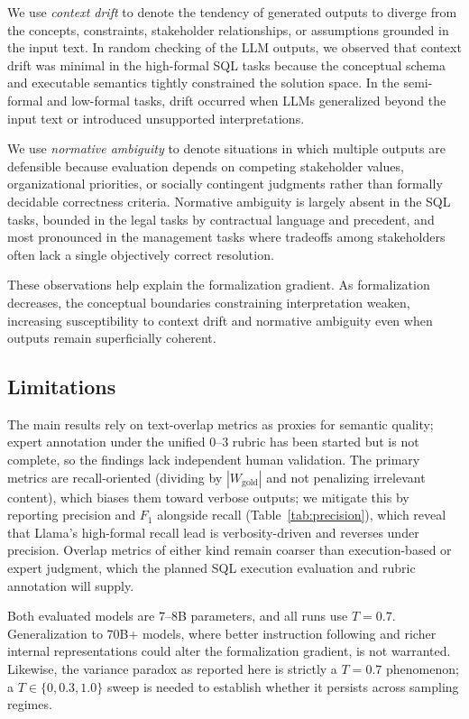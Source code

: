 \documentclass[runningheads]{llncs}
\begin{document}
We use \textit{context drift} to denote the tendency of generated outputs to diverge from the concepts, constraints, stakeholder relationships, or assumptions grounded in the input text. In random checking of the LLM outputs, we observed that context drift was minimal in the high-formal SQL tasks because the conceptual schema and executable semantics tightly constrained the solution space. In the semi-formal and low-formal tasks, drift occurred when LLMs generalized beyond the input text or introduced unsupported interpretations.

We use \textit{normative ambiguity} to denote situations in which multiple outputs are defensible because evaluation depends on competing stakeholder values, organizational priorities, or socially contingent judgments rather than formally decidable correctness criteria. Normative ambiguity is largely absent in the SQL tasks, bounded in the legal tasks by contractual language and precedent, and most pronounced in the management tasks where tradeoffs among stakeholders often lack a single objectively correct resolution.

These observations help explain the formalization gradient. As formalization decreases, the conceptual boundaries constraining interpretation weaken, increasing susceptibility to context drift and normative ambiguity even when outputs remain superficially coherent.


\subsection{Limitations}
\label{sec:limitations}

The main results rely on text-overlap metrics as proxies for semantic quality; expert annotation under the unified $0$--$3$ rubric has been started but is not complete, so the findings lack independent human validation. The primary metrics are recall-oriented (dividing by $|W_{\text{gold}}|$ and not penalizing irrelevant content), which biases them toward verbose outputs; we mitigate this by reporting precision and $F_1$ alongside recall (Table~\ref{tab:precision}), which reveal that Llama's high-formal recall lead is verbosity-driven and reverses under precision. Overlap metrics of either kind remain coarser than execution-based or expert judgment, which the planned SQL execution evaluation and rubric annotation will supply.

Both evaluated models are $7$--$8$B parameters, and all runs use $T\!=\!0.7$. Generalization to $70$B+ models, where better instruction following and richer internal representations could alter the formalization gradient, is not warranted. Likewise, the variance paradox as reported here is strictly a $T\!=\!0.7$ phenomenon; a $T \in \{0, 0.3, 1.0\}$ sweep is needed to establish whether it persists across sampling regimes.
\end{document}
